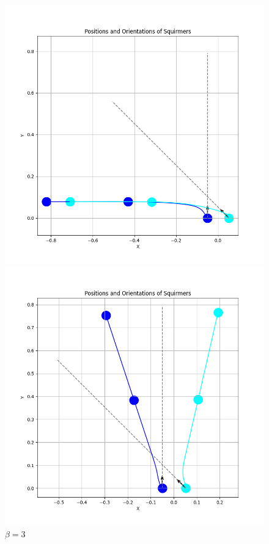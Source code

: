 \documentclass{article}
\begin{document}
\begin{figure}[H]
\begin{minipage}{0.49\textwidth}
        \includegraphics[width=1.1\textwidth]{graphs/simulations/sim_sq_sq/beta3/3pi_4_.png}
        \caption{\footnotesize $\beta = 3$}
    \end{minipage}
    \begin{minipage}{0.49\textwidth}
        \includegraphics[width=1.1\textwidth]{graphs/simulations/sim_sq_sq/betam1_5/3pi_4_.png}

\end{minipage}
\end{figure}
\end{document}
